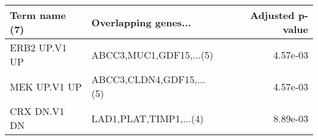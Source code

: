 \begin{tabular}{llr}
\toprule
Term name (7) &     Overlapping genes... &  Adjusted p-value \\
\midrule
ERB2 UP.V1 UP &  ABCC3,MUC1,GDF15,...(5) &          4.57e-03 \\
 MEK UP.V1 UP & ABCC3,CLDN4,GDF15,...(5) &          4.57e-03 \\
 CRX DN.V1 DN &   LAD1,PLAT,TIMP1,...(4) &          8.89e-03 \\
\bottomrule
\end{tabular}
